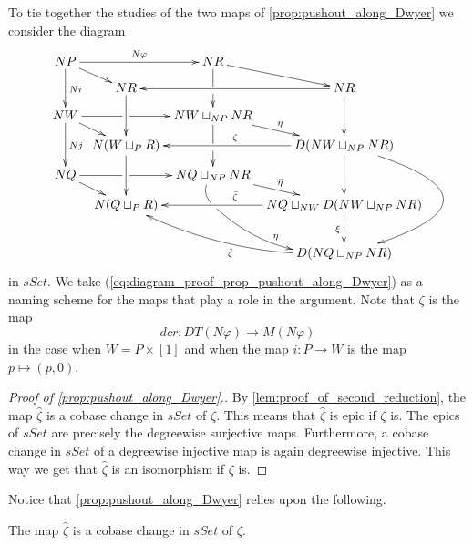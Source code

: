 To tie together the studies of the two maps of \cref{prop:pushout_along_Dwyer} we consider the diagram
\begin{equation}
\label{eq:diagram_proof_prop_pushout_along_Dwyer}
\begin{gathered}
\xymatrix@C=0.5em@R=0.8em{
NP \ar[dd]^{Ni} \ar[dr] \ar[rr]^{N\varphi } && NR \ar@{-}[d] \ar[dr] \\
& NR \ar[dd] & \ar[d] & NR \ar[ll] \ar[dd] \\
NW \ar[dd]^{Nj} \ar[dr] \ar@{-}[r] & \ar[r] & NW\sqcup _{NP}NR \ar@{-}[d] \ar[dr]^\eta \\
& N(W\sqcup _PR) \ar[dd] & \ar[d] & D(NW\sqcup _{NP}NR) \ar[ll]_\zeta \ar[dd] \ar@/^6.5pc/[dddd] \\
NQ \ar[dr] \ar@{-}[r] & \ar[r] & NQ\sqcup _{NP}NR \ar@{-}@/_/[d] \ar[dr]^{\bar{\eta } } \\
& N(Q\sqcup _PR) & \ar@/_1pc/[ddr]^\eta & NQ\sqcup _{NW}D(NW\sqcup _{NP}NR) \ar[ll]_{\bar{\zeta }} \ar@{-->}[dd]_\xi \\
\\
&&& D(NQ\sqcup _{NP}NR) \ar@/^1pc/[lluu]^{\hat{\zeta } }
}
\end{gathered}
\end{equation}
in $sSet$. We take (\ref{eq:diagram_proof_prop_pushout_along_Dwyer}) as a naming scheme for the maps that play a role in the argument. Note that $\zeta$ is the map
\[dcr:DT(N\varphi )\to M(N\varphi )\]
in the case when $W=P\times [1]$ and when the map $i:P\to W$ is the map $p\mapsto (p,0)$.
\begin{proof}[Proof of \cref{prop:pushout_along_Dwyer}.]
By \cref{lem:proof_of_second_reduction}, the map $\hat{\zeta }$ is a cobase change in $sSet$ of $\zeta$. This means that $\hat{\zeta }$ is epic if $\zeta$ is. The epics of $sSet$ are precisely the degreewise surjective maps. Furthermore, a cobase change in $sSet$ of a degreewise injective map is again degreewise injective. This way we get that $\hat{\zeta }$ is an isomorphism if $\zeta$ is.
\end{proof}
\noindent Notice that \cref{prop:pushout_along_Dwyer} relies upon the following.
\begin{lemma}\label{lem:proof_of_second_reduction}
The map $\hat{\zeta }$ is a cobase change in $sSet$ of $\zeta$.
\end{lemma}
